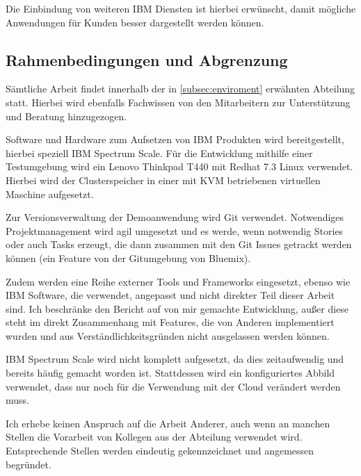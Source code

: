 Die Einbindung von weiteren IBM Diensten ist hierbei erwünscht, damit mögliche Anwendungen für Kunden besser dargestellt werden können.

\subsection{Rahmenbedingungen und Abgrenzung}

Sämtliche Arbeit findet innerhalb der in \autoref{subsec:enviroment} erwähnten Abteilung statt. Hierbei wird ebenfalls Fachwissen von den Mitarbeitern zur Unterstützung und Beratung hinzugezogen.

Software und Hardware zum Aufsetzen von IBM Produkten wird bereitgestellt, hierbei speziell IBM Spectrum Scale. Für die Entwicklung mithilfe einer Testumgebung wird ein Lenovo Thinkpad T440 mit Redhat 7.3 Linux verwendet. Hierbei wird der Clusterspeicher in einer mit KVM betriebenen virtuellen Maschine aufgesetzt.

Zur Versionsverwaltung der Demoanwendung wird \gls{Git} verwendet. Notwendiges Projektmanagement wird agil umgesetzt und es werde, wenn notwendig Stories oder auch Tasks erzeugt, die dann zusammen mit den Git Issues getrackt werden können (ein Feature von der Gitumgebung von Bluemix).

Zudem werden eine Reihe externer Tools und Frameworks eingesetzt, ebenso wie IBM Software, die verwendet, angepasst und nicht direkter Teil dieser Arbeit sind. Ich beschränke den Bericht auf von mir gemachte Entwicklung, außer diese steht im direkt Zusammenhang mit Features, die von Anderen implementiert wurden und aus Verständlichkeitsgründen nicht ausgelassen werden können.

IBM Spectrum Scale wird nicht komplett aufgesetzt, da dies zeitaufwendig und bereits häufig gemacht worden ist. Stattdessen wird ein konfiguriertes Abbild verwendet, dass nur noch für die Verwendung mit der Cloud verändert werden muss.

Ich erhebe keinen Anspruch auf die Arbeit Anderer, auch wenn an manchen Stellen die Vorarbeit von Kollegen aus der Abteilung verwendet wird. Entsprechende Stellen werden eindeutig gekennzeichnet und angemessen begründet.